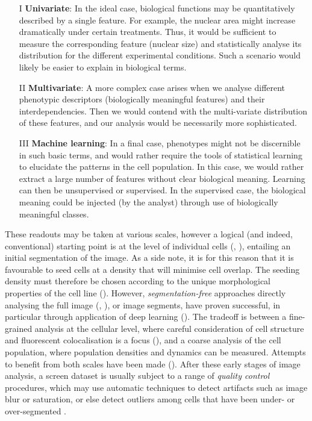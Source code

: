\begin{itemize}
\item[I] \textbf{Univariate}: In the ideal case, biological functions may be quantitatively described by a single feature. For example, the nuclear area might increase dramatically under certain treatments. Thus, it would be sufficient to measure the corresponding feature (nuclear size) and statistically analyse its distribution for the different experimental conditions. Such a scenario would likely be easier to explain in biological terms.
\item[II] \textbf{Multivariate}: A more complex case arises when we analyse different phenotypic descriptors (biologically meaningful features) and their interdependencies. Then we would contend with the multi-variate distribution of these features, and our analysis would be necessarily more sophisticated.
\item[III] \textbf{Machine learning}: In a final case, phenotypes might not be discernible in such basic terms, and would rather require the tools of statistical learning to elucidate the patterns in the cell population. In this case, we would rather extract a large number of features without clear biological meaning. Learning can then be unsupervised or supervised. In the supervised case, the biological meaning could be injected (by the analyst) through use of biologically meaningful classes.
\end{itemize}

These readouts may be taken at various scales, however a logical (and indeed, conventional) starting point is at the level of individual cells (\cite{perlman2004multidimensional}, \cite{adams2006compound}), entailing an initial segmentation of the image. As a side note, it is for this reason that it is favourable to seed cells at a density that will minimise cell overlap. The seeding density must therefore be chosen according to the unique morphological properties of the cell line (\cite{bray2016cell}). However, \emph{segmentation-free} approaches directly analysing the full image (\cite{orlov2008wnd}, \cite{uhlmann2016cp}), or image segments, have proven successful, in particular through application of deep learning (\cite{kraus2016classifying}). The tradeoff is between a fine-grained analysis at the cellular level, where careful consideration of cell structure and fluorescent colocalisation is a focus (\cite{slack2008characterizing}), and a coarse analysis of the cell population, where population densities and dynamics can be measured. Attempts to benefit from both scales have been made (\cite{godinez2017multi}). After these early stages of image analysis, a screen dataset is usually subject to a range of \emph{quality control} procedures, which may use automatic techniques to detect artifacts such as image blur or saturation, or else detect outliers among cells that have been under- or over-segmented \cite{Caicedo2017}.

